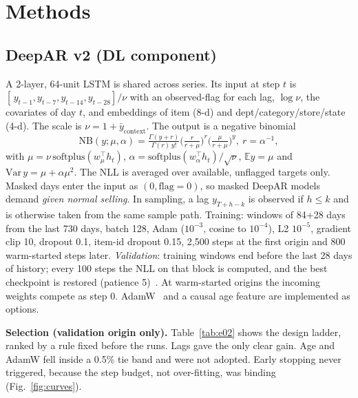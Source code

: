 \documentclass[conference]{IEEEtran}
\begin{document}
\section{Methods}
\subsection{DeepAR v2 (DL component)}
A 2-layer, 64-unit LSTM is shared across series. Its input at step $t$ is
$[\,y_{t-1},y_{t-7},y_{t-14},y_{t-28}]/\nu$ with an observed-flag for each lag, $\log\nu$, the covariates of day $t$, and embeddings of item (8-d) and dept/category/store/state (4-d). The scale is $\nu=1+\bar y_{\text{context}}$. The output is a negative binomial
\begin{equation}
\mathrm{NB}(y;\mu,\alpha)=\tfrac{\Gamma(y+r)}{\Gamma(r)\,y!}\big(\tfrac{r}{r+\mu}\big)^{r}\big(\tfrac{\mu}{r+\mu}\big)^{y},\ r=\alpha^{-1},
\end{equation}
with $\mu=\nu\,\mathrm{softplus}(w_\mu^\top h_t)$, $\alpha=\mathrm{softplus}(w_\alpha^\top h_t)/\sqrt\nu$, $\mathbb E y=\mu$ and $\mathrm{Var}\,y=\mu+\alpha\mu^2$. The NLL is averaged over available, unflagged targets only. Masked days enter the input as $(0,\text{flag}=0)$, so masked DeepAR models demand \emph{given normal selling}. In sampling, a lag $y_{T+h-k}$ is observed if $h\le k$ and is otherwise taken from the same sample path. Training: windows of 84+28 days from the last 730 days, batch 128, Adam ($10^{-3}$, cosine to $10^{-4}$), L2 $10^{-5}$, gradient clip 10, dropout 0.1, item-id dropout 0.15, 2,500 steps at the first origin and 800 warm-started steps later. \emph{Validation}: training windows end before the last 28 days of history; every 100 steps the NLL on that block is computed, and the best checkpoint is restored (patience 5)~\cite{prechelt1998}. At warm-started origins the incoming weights compete as step 0. AdamW~\cite{loshchilov2019} and a causal age feature are implemented as options.

\textbf{Selection (validation origin only).} Table~\ref{tab:e02} shows the design ladder, ranked by a rule fixed before the runs. Lags gave the only clear gain. Age and AdamW fell inside a 0.5\% tie band and were not adopted. Early stopping never triggered, because the step budget, not over-fitting, was binding (Fig.~\ref{fig:curves}).

\end{document}
